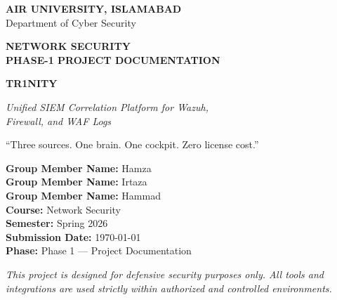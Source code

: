 \documentclass[11pt,a4paper]{article}
\begin{document}
\begin{titlepage}
\thispagestyle{empty}
\noindent\hspace*{-0.5cm}\colorbox{tr1Blue}{\parbox{\dimexpr\textwidth+1cm}{%
  \vspace{12pt}
  \centering
  {\color{white}\Large\bfseries AIR UNIVERSITY, ISLAMABAD}\\[3pt]
  {\color{white}\large Department of Cyber Security}\\
  \vspace{12pt}
}}

\vspace{2.0cm}

\begin{center}
{\color{tr1BlueMid}\Large\bfseries NETWORK SECURITY}\\[6pt]
{\color{tr1BlueMid}\Large\bfseries PHASE-1 PROJECT DOCUMENTATION}

\vspace{1.6cm}

{\color{tr1Blue}\fontsize{42pt}{48pt}\selectfont\bfseries TR1NITY}

\vspace{0.8cm}

{\color{tr1BlueMid}\large\itshape Unified SIEM Correlation Platform for Wazuh, \\[2pt] Firewall, and WAF Logs}

\vspace{0.4cm}

{\color{tr1BlueLight}\normalsize ``Three sources. One brain. One cockpit. Zero license cost.''}

\vspace{1.6cm}

\noindent\colorbox{tr1BlueBg}{\parbox{0.85\textwidth}{%
\vspace{4pt}
\begin{flushleft}
\color{tr1Blue}
\textbf{Group Member Name:} Hamza\\
\textbf{Group Member Name:} Irtaza\\
\textbf{Group Member Name:} Hammad\\[6pt]
\textbf{Course:} Network Security\\
\textbf{Semester:} Spring 2026\\
\textbf{Submission Date:} \today\\
\textbf{Phase:} Phase 1 — Project Documentation
\end{flushleft}
\vspace{4pt}
}}

\vfill

\noindent\colorbox{tr1BlueDeep}{\parbox{\dimexpr\textwidth-2pt}{%
\vspace{6pt}
\centering
{\color{white}\small\itshape This project is designed for defensive security purposes only. All tools and integrations are used strictly within authorized and controlled environments.}\\
\vspace{6pt}
}}

\vspace{0.6cm}
\end{center}
\end{titlepage}
\end{document}
